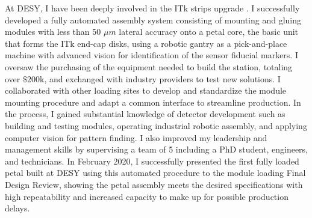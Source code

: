 \documentclass[a4paper]{article}
\begin{document}
\bigskip

At DESY, I have been deeply involved in the ITk strips upgrade \cite{ITKstrips}. I successfully developed a fully automated assembly system consisting of mounting and gluing modules with less than 50 $\mu m$ lateral accuracy onto a petal core, the basic unit that forms the ITk end-cap disks, using a robotic gantry as a pick-and-place machine with advanced vision for identification of the sensor fiducial markers. I oversaw the purchasing of the equipment needed to build the station, totaling over $\$200$k, and exchanged with industry providers to test new solutions. I collaborated with other loading sites to develop and standardize the module mounting procedure and adapt a common interface to streamline production. In the process, I gained substantial knowledge of detector development such as building and testing modules, operating industrial robotic assembly, and applying computer vision for pattern finding. I also improved my leadership and management skills by supervising a team of 5 including a PhD student, engineers, and technicians. In February 2020, I successfully presented the first fully loaded petal built at DESY using this automated procedure to the module loading Final Design Review, showing the petal assembly meets the desired specifications with high repeatability and increased capacity to make up for possible production delays.

\bigskip
\end{document}

